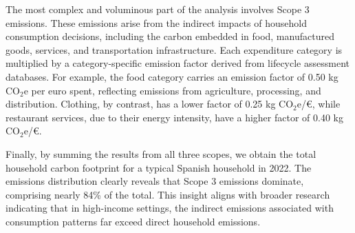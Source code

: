 \documentclass[12pt,a4paper]{article}
\begin{document}
The most complex and voluminous part of the analysis involves Scope 3 emissions. These emissions arise from the indirect impacts of household consumption decisions, including the carbon embedded in food, manufactured goods, services, and transportation infrastructure. Each expenditure category is multiplied by a category-specific emission factor derived from lifecycle assessment databases. For example, the food category carries an emission factor of 0.50 kg CO$_2$e per euro spent, reflecting emissions from agriculture, processing, and distribution. Clothing, by contrast, has a lower factor of 0.25 kg CO$_2$e/€, while restaurant services, due to their energy intensity, have a higher factor of 0.40 kg CO$_2$e/€.

\begin{table}[h]
\centering
\caption{Consumption-Based Emissions (Scope 3)}
\label{tab:scope3}
\end{table}

Finally, by summing the results from all three scopes, we obtain the total household carbon footprint for a typical Spanish household in 2022. The emissions distribution clearly reveals that Scope 3 emissions dominate, comprising nearly 84\% of the total. This insight aligns with broader research indicating that in high-income settings, the indirect emissions associated with consumption patterns far exceed direct household emissions.
\end{document}
